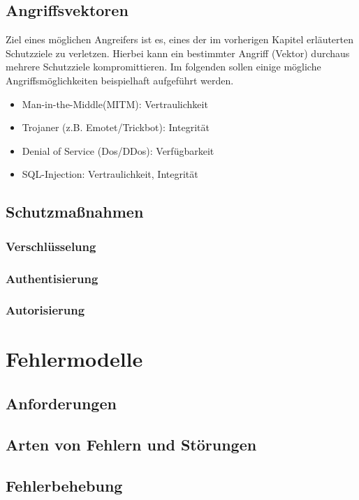 \documentclass[12pt,a4paper,parskip=half]{scrreprt}
\begin{document}
\section{Angriffsvektoren}

Ziel eines möglichen Angreifers ist es, eines der im vorherigen Kapitel erläuterten Schutzziele zu verletzen. Hierbei kann ein bestimmter Angriff (Vektor) durchaus mehrere Schutzziele kompromittieren. Im folgenden sollen einige mögliche Angriffsmöglichkeiten beispielhaft aufgeführt werden.

\begin{itemize}
	\item Man-in-the-Middle(MITM): Vertraulichkeit
	\item Trojaner (z.B. Emotet/Trickbot): Integrität
	\item Denial of Service (Dos/DDos): Verfügbarkeit
	\item SQL-Injection: Vertraulichkeit, Integrität
\end{itemize}


\section{Schutzmaßnahmen}


\subsection{Verschlüsselung}


\subsection{Authentisierung}


\subsection{Autorisierung}


\chapter{Fehlermodelle}


\section{Anforderungen}


\section{Arten von Fehlern und Störungen}


\section{Fehlerbehebung}


\newpage

\nocite{*}
\thispagestyle{headings}


 
\end{document}
